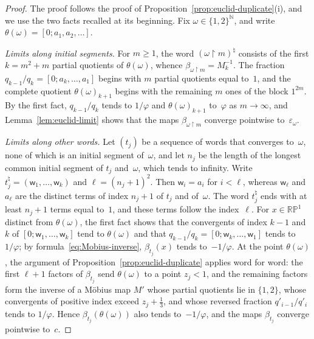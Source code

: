 \documentclass[psamsfonts]{amsart}
\theoremstyle{definition}
\theoremstyle{remark}
\newcommand{\restr}{{\restriction}}
\newcommand{\RP}{\mathbb{R}\mathbb{P}}
\numberwithin{equation}{section}
\begin{document}
\begin{proof}
  The proof follows the proof of Proposition~\ref{prop:euclid-duplicate}(i), and we use the two facts recalled at its beginning.
  Fix $\omega\in\{1,2\}^{\mathbb{N}}$, and write $\theta(\omega)=[0;a_1,a_2,\dots]$.

  \emph{Limits along initial segments.}
  For $m\ge1$, the word $(\omega\restr m)^\natural$ consists of the first $k=m^2+m$ partial quotients of $\theta(\omega)$, whence $\beta_{\omega\restr m}=M_k^{-1}$.
  The fraction $q_{k-1}/q_k=[0;a_k,\dots,a_1]$ begins with $m$ partial quotients equal to~$1$, and the complete quotient $\theta(\omega)_{k+1}$ begins with the remaining $m$ ones of the block $1^{2m}$.
  By the first fact, $q_{k-1}/q_k$ tends to $1/\varphi$ and $\theta(\omega)_{k+1}$ to~$\varphi$ as $m\to\infty$, and Lemma~\ref{lem:euclid-limit} shows that the maps $\beta_{\omega\restr m}$ converge pointwise to~$\varepsilon_\omega$.

  \emph{Limits along other words.}
  Let $(t_j)$ be a sequence of words that converges to~$\omega$, none of which is an initial segment of~$\omega$, and let $n_j$ be the length of the longest common initial segment of $t_j$ and~$\omega$, which tends to infinity.
  Write $t_j^\natural=(\mathsf{w}_1,\dots,\mathsf{w}_k)$ and $\ell=(n_j+1)^2$.
  Then $\mathsf{w}_i=a_i$ for $i<\ell$, whereas $\mathsf{w}_\ell$ and~$a_\ell$ are the distinct terms of index $n_j+1$ of $t_j$ and of~$\omega$.
  The word $t_j^\natural$ ends with at least $n_j+1$ terms equal to~$1$, and these terms follow the index~$\ell$.
  For $x\in\RP^1$ distinct from $\theta(\omega)$, the first fact shows that the convergents of index $k-1$ and~$k$ of $[0;\mathsf{w}_1,\dots,\mathsf{w}_k]$ tend to $\theta(\omega)$ and that $q_{k-1}/q_k=[0;\mathsf{w}_k,\dots,\mathsf{w}_1]$ tends to $1/\varphi$; by formula~\eqref{eq:Mobius-inverse}, $\beta_{t_j}(x)$ tends to~$-1/\varphi$.
  At the point $\theta(\omega)$, the argument of Proposition~\ref{prop:euclid-duplicate} applies word for word: the first $\ell+1$ factors of $\beta_{t_j}$ send $\theta(\omega)$ to a point $z_j<1$, and the remaining factors form the inverse of a Möbius map $M'$ whose partial quotients lie in $\{1,2\}$, whose convergents of positive index exceed $z_j+\frac13$, and whose reversed fraction $q'_{i-1}/q'_i$ tends to $1/\varphi$.
  Hence $\beta_{t_j}(\theta(\omega))$ also tends to~$-1/\varphi$, and the maps $\beta_{t_j}$ converge pointwise to~$c$.


\end{proof}
\end{document}
